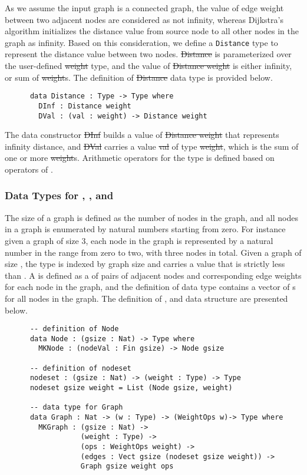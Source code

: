 As we assume the input graph is a connected graph, the value of edge weight between two adjacent nodes are considered as not infinity, whereas Dijkstra's algorithm initializes the distance value from source node to all other nodes in the graph as infinity. Based on this consideration, we define a \texttt{Distance} type to represent the distance value between two nodes. \st{Distance} is parameterized over the user-defined \st{weight} type, and the value of \st{Distance weight} is either infinity, or sum of \st{weight}s. The definition of \st{Distance} data type is provided below. 
\begin{lstlisting}
      data Distance : Type -> Type where
        DInf : Distance weight
        DVal : (val : weight) -> Distance weight
\end{lstlisting}

The data constructor \st{DInf} builds a value of \st{Distance weight} that represents infinity distance, and \st{DVal} carries a value \st{val} of type \st{weight}, which is the sum of one or more \st{weight}s. Arithmetic operators for the  type is defined based on operators of .
\\

\subsubsection{Data Types for , , and } \label{graph}
The size of a graph is defined as the number of nodes in the graph, and all nodes in a graph is enumerated by natural numbers starting from zero. For instance given a graph of size 3, each node in the graph is represented by a natural number in the range from zero to two, with three nodes in total. Given a graph  of size , the  type is indexed by graph size  and carries a value that is strictly less than . A  is defined as a  of pairs of adjacent nodes and corresponding edge weights for each node in the graph, and the definition of  data type contains a vector of s for all nodes in the graph. The definition of ,  and  data structure are presented below. 
\begin{lstlisting}
      -- definition of Node
      data Node : (gsize : Nat) -> Type where
        MKNode : (nodeVal : Fin gsize) -> Node gsize

      -- definition of nodeset
      nodeset : (gsize : Nat) -> (weight : Type) -> Type
      nodeset gsize weight = List (Node gsize, weight)

      -- data type for Graph
      data Graph : Nat -> (w : Type) -> (WeightOps w)-> Type where
        MKGraph : (gsize : Nat) ->
                  (weight : Type) ->
                  (ops : WeightOps weight) ->
                  (edges : Vect gsize (nodeset gsize weight)) ->
                  Graph gsize weight ops
\end{lstlisting}

